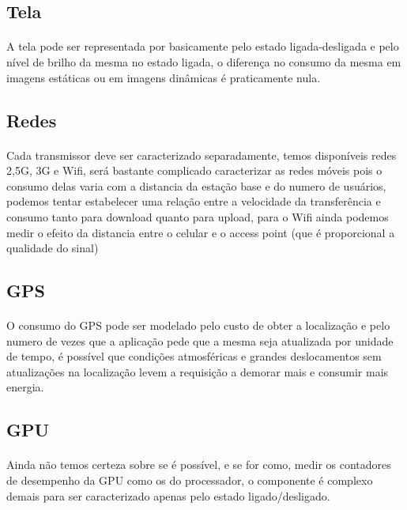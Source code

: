 \documentclass[11pt,a4paper,titlepage]{article}
\begin{document}
\subsection{Tela}
\paragraph{} A tela pode ser representada por basicamente pelo estado ligada-desligada e pelo nível de brilho da mesma no estado ligada, o diferença no consumo da mesma em imagens estáticas ou em imagens dinâmicas é praticamente nula.
\subsection{Redes}
\paragraph{} Cada transmissor deve ser caracterizado separadamente, temos disponíveis redes 2,5G, 3G e Wifi, será bastante complicado caracterizar as redes móveis pois o consumo delas varia com a distancia da estação base e do numero de usuários, podemos tentar estabelecer uma relação entre a velocidade da transferência e consumo tanto para download quanto para upload, para o Wifi ainda podemos medir o efeito da distancia entre o celular e o access point (que é proporcional a qualidade do sinal) 
\subsection{GPS}
\paragraph{} O consumo do GPS pode ser modelado pelo custo de obter a localização e pelo numero de vezes que a aplicação pede que a mesma seja atualizada por unidade de tempo, é possível que condições atmosféricas e grandes deslocamentos sem atualizações na localização levem a requisição a demorar mais e consumir mais energia. 
\subsection{GPU}
\paragraph{} Ainda não temos certeza sobre se é possível, e se for como, medir os contadores de desempenho da GPU como os do processador, o componente é complexo demais para ser caracterizado apenas pelo estado ligado/desligado.
\end{document}
